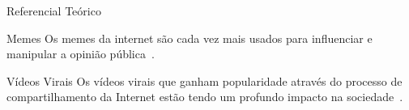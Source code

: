 \begin{frame}{Referencial Teórico}

\begin{block}{Memes}
    Os memes da internet são cada vez mais usados para influenciar e manipular a opinião pública~\cite{ZANNETTOU:2018}.
\end{block}

\begin{block}{Vídeos Virais}
    Os vídeos virais que ganham popularidade através do processo de compartilhamento da Internet estão tendo um profundo impacto na sociedade~\cite{JIANG:2014}.
\end{block}

\end{frame}
